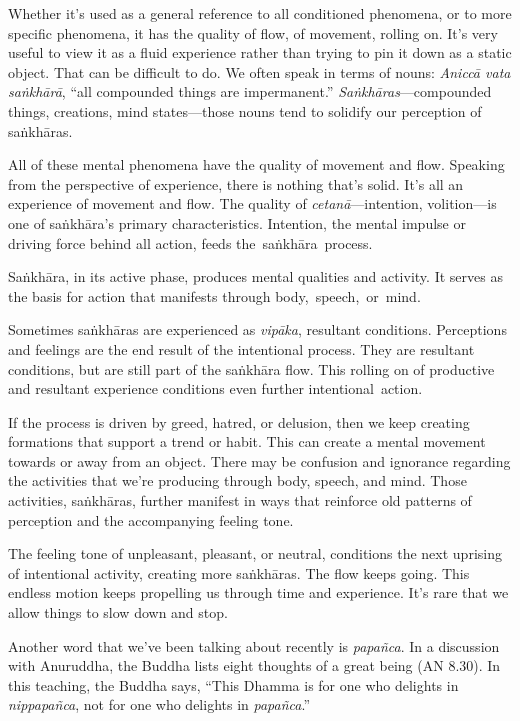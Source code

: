Whether it's used as a general reference to all conditioned phenomena, or to more specific phenomena, it has the quality of flow, of movement, rolling on. It's very useful to view it as a fluid experience rather than trying to pin it down as a static object. That can be difficult to do. We often speak in terms of nouns: \emph{Aniccā vata saṅkhārā}, ``all compounded things are impermanent.'' \emph{Saṅkhāras}---compounded things, creations, mind states---those nouns tend to solidify our perception of saṅkhāras.

All of these mental phenomena have the quality of movement and flow. Speaking from the perspective of experience, there is nothing that's solid. It's all an experience of movement and flow. The quality of \emph{cetanā}---intention, volition---is one of saṅkhāra's primary characteristics. Intention, the mental impulse or driving force behind all action, feeds \mbox{the saṅkhāra process.}

Saṅkhāra, in its active phase, produces mental qualities and activity. It serves as the basis for action that manifests through \mbox{body, speech, or mind}.

Sometimes saṅkhāras are experienced as \emph{vipāka}, resultant conditions. Perceptions and feelings are the end result of the intentional process. They are resultant conditions, but are still part of the saṅkhāra flow. This rolling on of productive and resultant experience conditions even further \mbox{intentional action.}

If the process is driven by greed, hatred, or delusion, then we keep creating formations that support a trend or habit. This can create a mental movement towards or away from an object. There may be confusion and ignorance regarding the activities that we're producing through body, speech, and mind. Those activities, saṅkhāras, further manifest in ways that reinforce old patterns of perception and the accompanying feeling tone.

The feeling tone of unpleasant, pleasant, or neutral, conditions the next uprising of intentional activity, creating more saṅkhāras. The flow keeps going. This endless motion keeps propelling us through time and experience. It's rare that we allow things to slow down and stop.

Another word that we've been talking about recently is \emph{papañca}. In a discussion with Anuruddha, the Buddha lists eight thoughts of a great being (AN 8.30). In this teaching, the Buddha says, ``This Dhamma is for one who delights in \emph{nippapañca}, not for one who delights in \emph{papañca}.''


